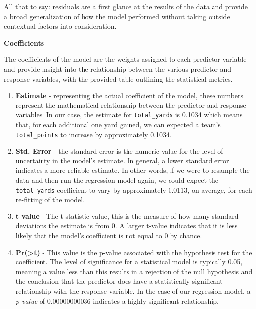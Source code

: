 \documentclass[
  letterpaper,
]{krantz}
\providecommand{\tightlist}{%
  \setlength{\itemsep}{0pt}\setlength{\parskip}{0pt}}\usepackage{longtable,booktabs,array}
\begin{document}
\begin{tcolorbox}
All that to say: residuals are a first glance at the results of the data
and provide a broad generalization of how the model performed without
taking outside contextual factors into consideration.

\textbf{Coefficients}

The coefficients of the model are the weights assigned to each predictor
variable and provide insight into the relationship between the various
predictor and response variables, with the provided table outlining the
statistical metrics.

\begin{enumerate}
\def\labelenumi{\arabic{enumi}.}
\tightlist
\item
  \textbf{Estimate} - representing the actual coefficient of the model,
  these numbers represent the mathematical relationship between the
  predictor and response variables. In our case, the estimate for
  \texttt{total\_yards} is 0.1034 which means that, for each additional
  one yard gained, we can expected a team's \texttt{total\_points} to
  increase by approximately 0.1034.
\item
  \textbf{Std. Error} - the standard error is the numeric value for the
  level of uncertainty in the model's estimate. In general, a lower
  standard error indicates a more reliable estimate. In other words, if
  we were to resample the data and then run the regression model again,
  we could expect the \texttt{total\_yards} coefficient to vary by
  approximately 0.0113, on average, for each re-fitting of the model.
\item
  \textbf{t value} - The t-statistic value, this is the measure of how
  many standard deviations the estimate is from 0. A larger t-value
  indicates that it is less likely that the model's coefficient is not
  equal to 0 by chance.
\item
  \textbf{Pr(\textgreater\textbar t\textbar)} - This value is the
  p-value associated with the hypothesis test for the coefficient. The
  level of significance for a statistical model is typically 0.05,
  meaning a value less than this results in a rejection of the null
  hypothesis and the conclusion that the predictor does have a
  statistically significant relationship with the response variable. In
  the case of our regression model, a \emph{p-value} of 0.00000000036
  indicates a highly significant relationship.
\end{enumerate}

\end{tcolorbox}
\end{document}
